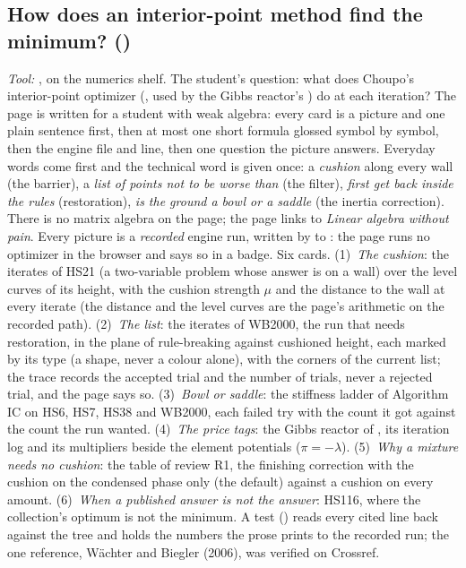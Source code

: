 \documentclass[11pt,a4paper]{article}
\begin{document}
\subsection*{How does an interior-point method find the minimum? \quad()}\label{sec:edu-interior-point}
\textit{\small Tool:} , on the numerics shelf.  The
student's question: what does Choupo's interior-point optimizer
(, used by the Gibbs reactor's ) do at each iteration?  The page is written for a student with
weak algebra: every card is a picture and one plain sentence first, then at
most one short formula glossed symbol by symbol, then the engine file and
line, then one question the picture answers.  Everyday words come first and
the technical word is given once: a \emph{cushion} along every wall (the
barrier), a \emph{list of points not to be worse than} (the filter), \emph{first
get back inside the rules} (restoration), \emph{is the ground a bowl or a
saddle} (the inertia correction).  There is no matrix algebra on the page; the
page links to \emph{Linear algebra without pain}.  Every picture is a
\emph{recorded} engine run, written by
 to
: the page runs no optimizer in
the browser and says so in a badge.  Six cards.  (1)~\emph{The cushion}: the
iterates of HS21 (a two-variable problem whose answer is on a wall) over the
level curves of its height, with the cushion strength $\mu$ and the distance
to the wall at every iterate (the distance and the level curves are the
page's arithmetic on the recorded path).  (2)~\emph{The list}: the iterates of
WB2000, the run that needs restoration, in the plane of rule-breaking
against cushioned height, each marked by its type (a shape, never a colour
alone), with the corners of the current list; the trace records the accepted
trial and the number of trials, never a rejected trial, and the page says so.
(3)~\emph{Bowl or saddle}: the stiffness ladder of Algorithm IC on HS6, HS7,
HS38 and WB2000, each failed try with the count it got against the count the
run wanted.  (4)~\emph{The price tags}: the Gibbs reactor of
, its iteration log and its multipliers beside
the element potentials ($\pi=-\lambda$).  (5)~\emph{Why a mixture needs no
cushion}: the table of review R1, the finishing correction with the cushion
on the condensed phase only (the default) against a cushion on every amount.
(6)~\emph{When a published answer is not the answer}: HS116, where the
collection's optimum is not the minimum.  A test
() reads every cited line back
against the tree and holds the numbers the prose prints to the recorded run;
the one reference, W\"achter and Biegler (2006), was verified on Crossref.
\end{document}
